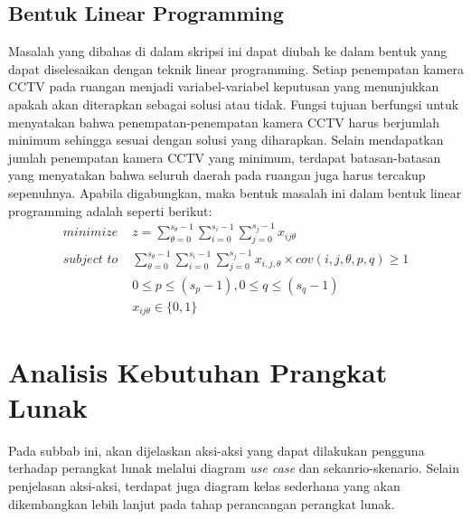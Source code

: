 \subsection{Bentuk Linear Programming}
Masalah yang dibahas di dalam skripsi ini dapat diubah ke dalam bentuk yang dapat diselesaikan dengan teknik linear programming. Setiap penempatan kamera CCTV pada ruangan menjadi variabel-variabel keputusan yang menunjukkan apakah akan diterapkan sebagai solusi atau tidak. Fungsi tujuan berfungsi untuk menyatakan bahwa penempatan-penempatan kamera CCTV harus berjumlah minimum sehingga sesuai dengan solusi yang diharapkan. Selain mendapatkan jumlah penempatan kamera CCTV yang minimum, terdapat batasan-batasan yang menyatakan bahwa seluruh daerah pada ruangan juga harus tercakup sepenuhnya. Apabila digabungkan, maka bentuk masalah ini dalam bentuk linear programming adalah seperti berikut:
\begin{equation*}
	\begin{split}
		\textit{minimize } & z = \sum_{\theta=0}^{s_{\theta}-1} \sum_{i=0}^{s_i-1} \sum_{j=0}^{s_j-1} x_{ij\theta}\\
		\textit{subject to } & \sum_{\theta=0}^{s_{\theta}-1} \sum_{i=0}^{s_i-1} \sum_{j=0}^{s_j-1} x_{i,j,\theta} \times cov(i,j,\theta,p,q) \geq 1\\
		& 0 \leq p \leq (s_p - 1), 0 \leq q \leq (s_q - 1)\\
		& x_{ij\theta} \in \{0,1\}
	\end{split}
\end{equation*}

\section{Analisis Kebutuhan Prangkat Lunak}
Pada subbab ini, akan dijelaskan aksi-aksi yang dapat dilakukan pengguna terhadap perangkat lunak melalui diagram \textit{use case} dan sekanrio-skenario. Selain penjelasan aksi-aksi, terdapat juga diagram kelas sederhana yang akan dikembangkan lebih lanjut pada tahap perancangan perangkat lunak. 

